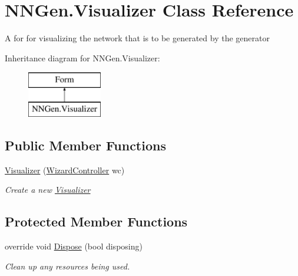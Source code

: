 \hypertarget{class_n_n_gen_1_1_visualizer}{}\section{N\+N\+Gen.\+Visualizer Class Reference}
\label{class_n_n_gen_1_1_visualizer}


A for for visualizing the network that is to be generated by the generator  


Inheritance diagram for N\+N\+Gen.\+Visualizer\+:\begin{figure}[H]
\begin{center}
\leavevmode
\includegraphics[height=2.000000cm]{class_n_n_gen_1_1_visualizer}
\end{center}
\end{figure}
\subsection*{Public Member Functions}
\begin{DoxyCompactItemize}
\item 
\hyperlink{class_n_n_gen_1_1_visualizer_af5c22f605f7a4ca2a85a61190aed634b}{Visualizer} (\hyperlink{class_n_n_gen_1_1_wizard_controller}{Wizard\+Controller} wc)
\begin{DoxyCompactList}\small\item\em Create a new \hyperlink{class_n_n_gen_1_1_visualizer}{Visualizer} \end{DoxyCompactList}\end{DoxyCompactItemize}
\subsection*{Protected Member Functions}
\begin{DoxyCompactItemize}
\item 
override void \hyperlink{class_n_n_gen_1_1_visualizer_a6a1763644ddf1ec465fbe6ea234d41b0}{Dispose} (bool disposing)
\begin{DoxyCompactList}\small\item\em Clean up any resources being used. \end{DoxyCompactList}\end{DoxyCompactItemize}
